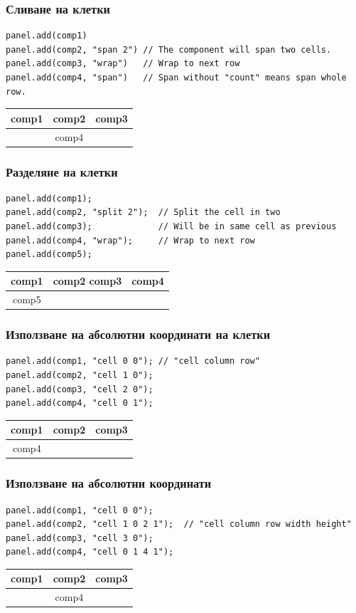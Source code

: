 \documentclass{beamer}
\begin{document}
\begin{frame}[fragile]
  \frametitle{Сливане на клетки}
  \transdissolve
\begin{lstlisting}
panel.add(comp1)
panel.add(comp2, "span 2") // The component will span two cells.
panel.add(comp3, "wrap")   // Wrap to next row 
panel.add(comp4, "span")   // Span without "count" means span whole row.  
\end{lstlisting}
  \begin{tabular}{|c|c|c|c|}
    \hline
    comp1 & \multicolumn{2}{|c|}{comp2} & comp3 \\
    \hline 
    \multicolumn{4}{|c|}{comp4} \\  
    \hline
  \end{tabular}
\end{frame}

\begin{frame}[fragile]
  \frametitle{Разделяне на клетки}
  \transdissolve
\begin{lstlisting}
panel.add(comp1);
panel.add(comp2, "split 2");  // Split the cell in two
panel.add(comp3);             // Will be in same cell as previous
panel.add(comp4, "wrap");     // Wrap to next row
panel.add(comp5);  
\end{lstlisting}
  \begin{tabular}{|c|c|c|}
    \hline
    comp1 & comp2 comp3 & comp4 \\
    \hline 
    comp5 &  & \\  
    \hline
  \end{tabular}
\end{frame}

\begin{frame}[fragile]
  \frametitle{Използване на абсолютни координати на клетки}
  \transdissolve
\begin{lstlisting}
panel.add(comp1, "cell 0 0"); // "cell column row"
panel.add(comp2, "cell 1 0");
panel.add(comp3, "cell 2 0");
panel.add(comp4, "cell 0 1");
\end{lstlisting}
  \begin{tabular}{|c|c|c|}
    \hline
    comp1 & comp2 & comp3 \\
    \hline 
    comp4 &  & \\  
    \hline
  \end{tabular}
\end{frame}

\begin{frame}[fragile]
  \frametitle{Използване на абсолютни координати}
  \transdissolve
\begin{lstlisting}
panel.add(comp1, "cell 0 0");
panel.add(comp2, "cell 1 0 2 1");  // "cell column row width height"
panel.add(comp3, "cell 3 0");
panel.add(comp4, "cell 0 1 4 1");
\end{lstlisting}
  \begin{tabular}{|c|c|c|c|}
    \hline
    comp1 & \multicolumn{2}{|c|}{comp2} & comp3 \\
    \hline 
    \multicolumn{4}{|c|}{comp4} \\  
    \hline
  \end{tabular}  
\end{frame}
\end{document}
